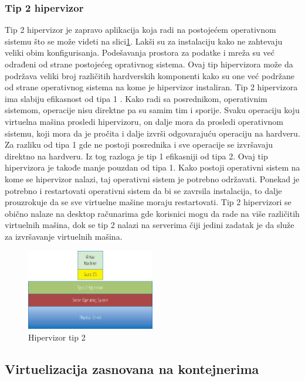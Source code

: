\documentclass[12pt,oneside]{memoir}
\begin{document}
\subsubsection{Tip 2 hipervizor}
Tip 2 hipervizor je zapravo aplikacija koja radi na postojećem operativnom sistemu što se može videti na slici\ref{fig:hipervizorTip2}. Lakši su za instalaciju kako ne zahtevaju veliki obim konfigurisanja. Podešavanja prostora za podatke i mreža su već odrađeni od strane postojećeg oprativnog sistema. Ovaj tip hipervizora može da podržava veliki broj različitih hardverskih komponenti kako su one već podržane od strane operativnog sistema na kome je hipervizor instaliran. Tip 2 hipervizora ima slabiju efikasnost od tipa 1 \cite{ve}. Kako radi sa posrednikom, operativnim sistemom, operacije nisu direktne pa su samim tim i sporije. Svaku operaciju koju virtuelna mašina prosledi hipervizoru, on dalje mora da prosledi operativnom sistemu, koji mora da je pročita i dalje izvrši odgovarajuću operaciju na hardveru. Za razliku od tipa 1 gde ne postoji posrednika i sve operacije se izvršavaju direktno na hardveru. Iz tog razloga je tip 1 efikasniji od tipa 2. 
Ovaj tip hipervizora je takođe manje pouzdan od tipa 1. Kako postoji operativni sistem na kome se hipervizor nalazi, taj operativni sistem je potrebno održavati. Ponekad je potrebno i restartovati operativni sistem da bi se zavrsila instalacija, to dalje prouzrokuje da se sve virtuelne mašine moraju restartovati. Tip 2 hipervizori se obično nalaze na desktop računarima gde korisnici mogu da rade na više različitih virtuelnih mašina, dok se tip 2 nalazi na serverima čiji jedini zadatak je da služe za izvršavanje virtuelnih mašina.

\begin{figure}[!ht]
  \centering
  \includegraphics[width=0.5\textwidth]{Slika 3.jpg}
  \caption{Hipervizor tip 2}
  \label{fig:hipervizorTip2}
\end{figure}

 
\subsection{Virtuelizacija zasnovana na kontejnerima}
\end{document}
